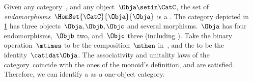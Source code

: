 \begin{example}
    Given any category~\CatC, and any object~$\Obja\setin \CatC$, the set of \emph{endomorphisms}~$\HomSet{\CatC}{\Obja}{\Obja}$ is a .
    The category depicted in \cref{fig:monoid_endomorphisms} has three objects~$\Obja,\Objb,\Objc$ and several morphisms.~$\Obja$ has four endomorphisms,~$\Objb$ two, and~$\Objc$ three (including ).
    Take the binary operation~$\mtimes$ to be the composition~$\mthen$ in~\CatC, and the  to be the identity~$\catidat\Obja$.
    The associativity and unitality laws of the category~\CatC coincide with the ones of the monoid's definition, and are satisfied.
    Therefore, we can identify a  as a one-object category.
\end{example}

\begin{figure}[h!]
    \centering
    \caption{}
    \label{fig:monoid_endomorphisms}
\end{figure}

